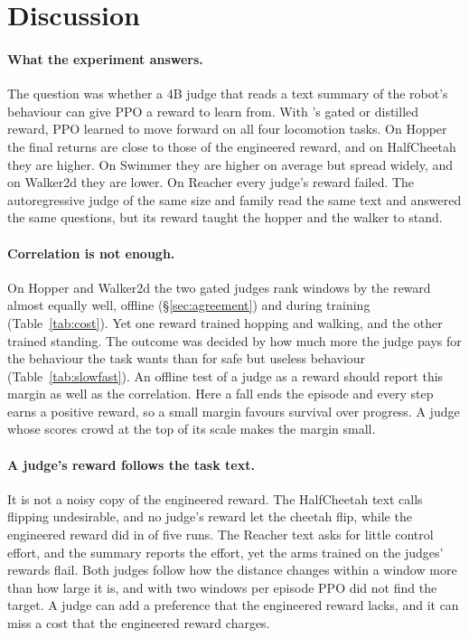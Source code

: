 
\section{Discussion}\label{sec:discussion}

\paragraph{What the experiment answers.} The question was whether a 4B judge that reads a text summary of the robot's
behaviour can give PPO a reward to learn from. With \kev{}'s gated or distilled reward, PPO learned to move forward on
all four locomotion tasks. On Hopper the final returns are close to those of the engineered reward, and on HalfCheetah
they are higher. On Swimmer they are higher on average but spread widely, and on Walker2d they are lower. On Reacher
every judge's reward failed. The autoregressive judge of the same size and family read the same text and answered the same questions, but its
reward taught the hopper and the walker to stand.

\paragraph{Correlation is not enough.} On Hopper and Walker2d the two gated judges rank windows by the reward almost
equally well, offline (\S\ref{sec:agreement}) and during training (Table~\ref{tab:cost}). Yet one reward trained hopping
and walking, and the other trained standing. The outcome was decided by how much more the judge pays for the behaviour the
task wants than for safe but useless behaviour (Table~\ref{tab:slowfast}). An offline test of a judge as a reward should
report this margin as well as the correlation. Here a fall ends the episode and every step earns a positive reward, so a
small margin favours survival over progress. A judge whose scores crowd at the top of its scale makes the margin small.

\paragraph{A judge's reward follows the task text.} It is not a noisy copy of the engineered reward. The HalfCheetah text
calls flipping undesirable, and no judge's reward let the cheetah flip, while the engineered reward did in
 of five runs. The Reacher text asks for little control effort, and the summary reports the
effort, yet the arms trained on the judges' rewards flail. Both judges follow how the distance changes within a window more than how large it
is, and with two windows per episode PPO did not find the target. A judge can add a preference that the engineered
reward lacks, and it can miss a cost that the engineered reward charges.

